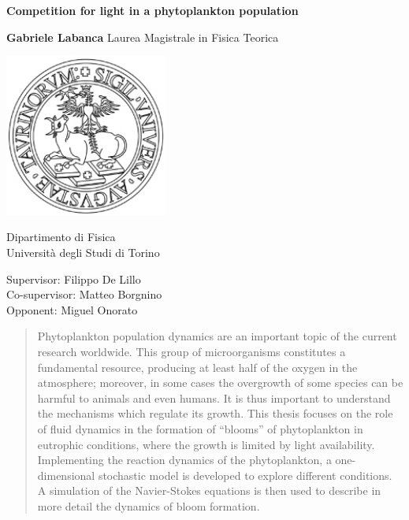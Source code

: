 \documentclass{report}
\begin{document}
\begin{titlepage}
    \begin{center}
        \vspace*{1cm}
        \Huge
        \textbf{Competition for light in a phytoplankton population}
        \vspace{0.5cm}
        
        \vspace{1.5cm}
        \textbf{Gabriele Labanca}
        \vfill
        Laurea Magistrale in Fisica Teorica \\ 
        \vspace{0.8cm}
        
        
           \includegraphics[width=0.4\textwidth]{img/logo_unito}
        
        
        \Large
        Dipartimento di Fisica\\
        Università degli Studi di Torino
    
        \vspace{0.8cm}
        \large
        Supervisor: Filippo De Lillo \\
        Co-supervisor: Matteo Borgnino \\
        Opponent: Miguel Onorato
    \end{center}
\end{titlepage}

\begin{abstract}
    Phytoplankton population dynamics are an important topic of the current research worldwide. This group of microorganisms constitutes a fundamental resource, producing at least half of the oxygen in the atmosphere; moreover, in some cases the overgrowth of some species can be harmful to animals and even humans.
    It is thus important to understand the mechanisms which regulate its growth. This thesis focuses on the role of fluid dynamics in the formation of ``blooms'' of phytoplankton in eutrophic conditions, where the growth is limited by light availability. Implementing the reaction dynamics of the phytoplankton, a one-dimensional stochastic model is developed to explore different conditions. A simulation of the Navier-Stokes equations is then used to describe in more detail the dynamics of bloom formation. 
\end{abstract}
\end{document}
